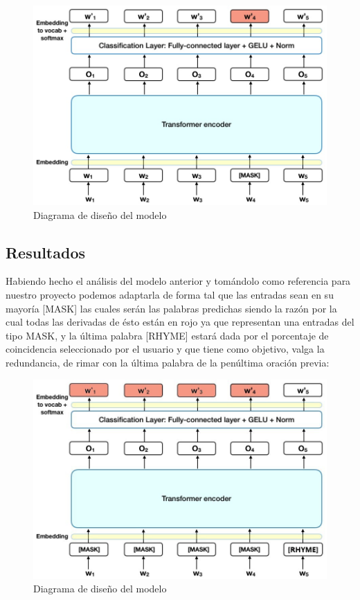 \documentclass[12pt, a4paper, titlepage]{report}
\begin{document}
		\begin{figure}[H]
			\includegraphics[width=12cm]{./imagenes/Disenio/Iteracion_3/bert_preoutput_model.jpg}
			\centering 
			\caption{Diagrama de diseño del modelo}
		\end{figure}
		
		\subsection{Resultados} %
		
		Habiendo hecho el análisis del modelo anterior y tomándolo como referencia para nuestro proyecto podemos adaptarla de forma tal que las entradas sean en su mayoría [MASK] las cuales serán las palabras predichas siendo la razón por la cual todas las derivadas de ésto están en rojo ya que representan una entradas del tipo MASK, y la última palabra [RHYME] estará dada por el porcentaje de coincidencia seleccionado por el usuario y que tiene como objetivo, valga la redundancia, de rimar con la última palabra de la penúltima oración previa: 
		\begin{figure}[H]
			\includegraphics[width=12cm]{./imagenes/Disenio/Iteracion_3/bert_output_model.jpg}
			\centering 
			\caption{Diagrama de diseño del modelo}
		\end{figure}
		
\end{document}
